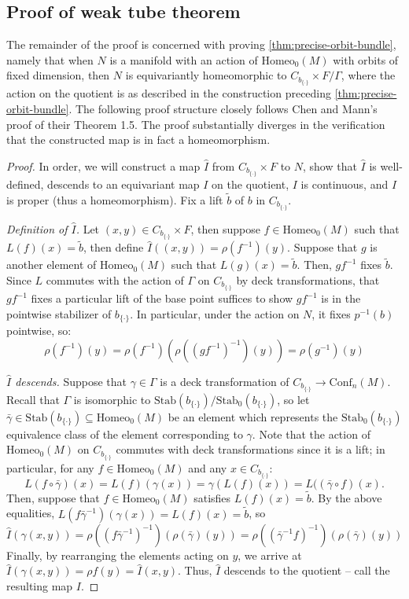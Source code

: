 \documentclass[10pt, oneside]{article}
\newcommand{\homeo}[1][S^1]{\text{Homeo}_0(#1)}
\newcommand{\conf}[2][S^1]{\text{Conf}_{#2}(#1)}
\newcommand{\set}{{\{\cdot\}}}
\newcommand{\stab}[1]{\text{Stab}(#1)}
\newcommand{\pstab}[1]{\text{Stab}_0(#1)}
\newcommand{\maxcov}{C_{b_\set}}
\theoremstyle{definition}
\theoremstyle{definition}
\begin{document}
\subsection{Proof of weak tube theorem}\label{subsec:orbit-bundle-proof}
The remainder of the proof is concerned with proving \cref{thm:precise-orbit-bundle}, namely that when $N$ is a manifold with an action of $\homeo[M]$ with orbits of fixed dimension, then $N$ is equivariantly homeomorphic to $\maxcov\times F/\Gamma$, where the action on the quotient is as described in the construction preceding \cref{thm:precise-orbit-bundle}. The following proof structure closely follows Chen and Mann's \cite{chen:StructureTheorems} proof of their Theorem 1.5. The proof substantially diverges in the verification that the constructed map is in fact a homeomorphism.

\begin{proof}
    In order,
    we will construct a map $\hat{I}$ from $\maxcov \times F$ to $N$,
    show that $\hat{I}$ is well-defined,
    descends to an equivariant map $I$ on the quotient,
    $I$ is continuous, and
    $I$ is proper (thus a homeomorphism).
    Fix a lift $\tilde{b}$ of $b$ in $\maxcov$.

    \medskip
    {\it Definition of $\hat{I}$.} Let $(x, y)\in \maxcov\times F$, then
    suppose $f\in\homeo[M]$ such that $L(f)(x) = \tilde{b}$,
    then define $\hat{I}((x,y)) = \rho(f^{-1})(y)$. Suppose that $g$ is another element of $\homeo[M]$ such that $L(g)(x) = \tilde{b}$. Then, $gf^{-1}$ fixes $\tilde{b}$. Since $L$ commutes with the action of $\Gamma$ on $\maxcov$ by deck transformations, that $gf^{-1}$ fixes a particular lift of the base point suffices to show $gf^{-1}$ is in the pointwise stabilizer of $b_{\set}$. In particular, under the action on $N$, it fixes $p^{-1}(b)$ pointwise, so:
$$\rho(f^{-1})(y) = \rho(f^{-1})(\rho((gf^{-1})^{-1})(y)) = \rho(g^{-1})(y)$$

    \medskip
    {\it $\hat{I}$ descends.} Suppose that $\gamma\in\Gamma$ is a deck transformation of $\maxcov\to \conf[M]{n}$. Recall that $\Gamma$ is isomorphic to $\stab{b_\set}/\pstab{b_\set}$, so let $\bar{\gamma}\in\stab{b_\set}\subseteq\homeo[M]$ be an element which represents the $\pstab{b_\set}$ equivalence class of the element corresponding to $\gamma$. Note that the action of $\homeo[M]$ on $\maxcov$ commutes with deck transformations since it is a lift; in particular, for any $f\in\homeo[M]$ and any $x\in\maxcov$:
    $$L(f\circ\bar{\gamma})(x) = L(f)(\gamma(x)) = \gamma(L(f)(x)) = L((\bar{\gamma}\circ f)(x).$$
    Then, suppose that $f\in\homeo[M]$ satisfies $L(f)(x) = \tilde{b}$. By the above equalities, $L(f\bar{\gamma}^{-1})(\gamma(x)) = L(f)(x) = \tilde{b}$, so $$\hat{I}(\gamma(x, y)) = \rho((f\bar{\gamma}^{-1})^{-1})(\rho(\bar{\gamma})(y)) = \rho((\bar{\gamma}^{-1}f)^{-1})(\rho(\bar{\gamma})(y))$$
    Finally, by rearranging the elements acting on $y$, we arrive at $\hat{I}(\gamma(x,y)) = \rho{f}(y) = \hat{I}(x,y)$. Thus, $\hat{I}$ descends to the quotient -- call the resulting map $I$.


\end{proof}
\end{document}
